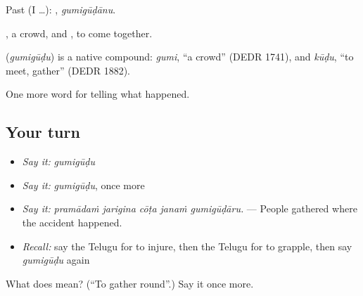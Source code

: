 Past (I …): , \emph{gumigūḍānu}.

, a crowd, and , to come together.

\begin{cousinweb}
\textbf{} (\emph{gumigūḍu}) is a native compound: \emph{gumi}, \textquotedblleft{}a crowd\textquotedblright{} (DEDR 1741), and \emph{kūḍu}, \textquotedblleft{}to meet, gather\textquotedblright{} (DEDR 1882).
\end{cousinweb}

\begin{grammarlens}[title={What you've built}]
One more word for telling what happened.
\end{grammarlens}

\subsection*{Your turn}
\begin{itemize}
\raggedright
  \item \emph{Say it:} \emph{gumigūḍu}
  \item \emph{Say it:} \emph{gumigūḍu}, once more
  \item \emph{Say it:} \emph{pramādaṁ jarigina cōṭa janaṁ gumigūḍāru.} — People gathered where the accident happened.
  \item \emph{Recall:} say the Telugu for to injure, then the Telugu for to grapple, then say \emph{gumigūḍu} again
\end{itemize}

\begin{tcolorbox}[breakable,colback=teal!4,colframe=teal!35!black,title={Before you move on}]
What does  mean? (\textquotedblleft{}To gather round\textquotedblright{}.) Say it once more.
\end{tcolorbox}
